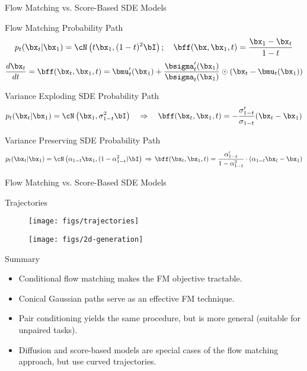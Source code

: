 \documentclass{beamer}
\begin{document}
\begin{frame}{Flow Matching vs. Score-Based SDE Models}
	\begin{block}{Flow Matching Probability Path}
		\vspace{-0.3cm}
		\[
			p_t(\bx_t | \bx_1) = \cN\left(t \bx_1, (1-t)^2 \bI\right); \quad \bff(\bx, \bx_1, t) = \frac{\bx_1  - \bx_t}{1-t}
		\]
		\vspace{-0.3cm}
		\[
	 		\frac{d\bx_t}{dt} = \bff(\bx_t, \bx_1, t) =  \bmu_t'(\bx_1) + \frac{\bsigma_t'(\bx_1)}{\bsigma_t(\bx_1)} \odot (\bx_t - \bmu_t(\bx_1))
		\]
		\eqpause
	\end{block}
	\begin{block}{Variance Exploding SDE Probability Path}
		\vspace{-0.5cm}
		\[
				p_t(\bx_t | \bx_1) = \cN\left(\bx_1, \sigma^2_{1-t}  \bI\right) \quad \Rightarrow \quad 
				\bff(\bx_t, \bx_1, t) = - \frac{\sigma'_{1-t}}{\sigma_{1-t}} (\bx_t - \bx_1)
		\]
		\vspace{-0.3cm}
	\end{block}
	\eqpause
	\begin{block}{Variance Preserving SDE Probability Path}
		\vspace{-0.5cm}
		{\small
		\[
			p_t(\bx_t | \bx_1) = \cN\left(\alpha_{1-t}  \bx_1, (1 - \alpha^2_{1-t})  \bI \right)  \, \Rightarrow \, 
		\bff(\bx_t, \bx_1, t) = \frac{\alpha'_{1-t}}{1 - \alpha^2_{1-t}}\cdot \left(\alpha_{1-t}  \bx_t - \bx_1\right)
		\]
		}
	\end{block}
\end{frame}
\begin{frame}{Flow Matching vs. Score-Based SDE Models}
	\begin{block}{Trajectories}
		\vspace{-0.3cm}
		\begin{figure}
			\centering
			\texttt{[image: figs/trajectories]}
		\end{figure}
		\vspace{-0.3cm}
	\end{block}
	\eqpause
	\begin{figure}
		\centering
		\texttt{[image: figs/2d-generation]}
	\end{figure}
\end{frame}
\begin{frame}{Summary}
	\begin{itemize}
		\item Conditional flow matching makes the FM objective tractable.
		\vfill
		\item Conical Gaussian paths serve as an effective FM technique.
		\vfill
		\item Pair conditioning yields the same procedure, but is more general (suitable for unpaired tasks).
		\vfill
		\item Diffusion and score-based models are special cases of the flow matching approach, but use curved trajectories.
	\end{itemize}
\end{frame}
\end{document}
